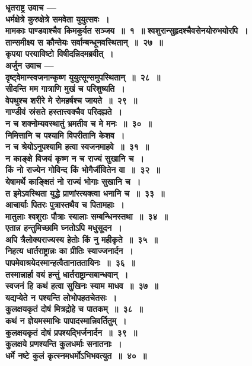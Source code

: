 \begin{center}{\bfseries धृतराष्ट्र उवाच —\\ धर्मक्षेत्रे कुरुक्षेत्रे समवेता युयुत्सवः~।\\मामकाः पाण्डवाश्चैव किमकुर्वत सञ्जय~॥~१~॥}
{\bfseries श्वशुरान्सुहृदश्चैवसेनयोरुभयोरपि~।\\तान्समीक्ष्य स कौन्तेयः सर्वान्बन्धूनवस्थितान्~॥~२७~॥}\\[10pt]
{\bfseries कृपया परयाविष्टो विषीदन्निदमब्रवीत्~।\\अर्जुन उवाच —\\दृष्ट्वेमान्स्वजनान्कृष्ण युयुत्सून्समुपस्थितान्~॥~२८~॥}\\[10pt]
{\bfseries सीदन्ति मम गात्राणि मुखं च परिशुष्यति~।\\वेपथुश्च शरीरे मे रोमहर्षश्च जायते~॥~२९~॥}\\[10pt]
{\bfseries गाण्डीवं स्रंसते हस्तात्त्वक्चैव परिदह्यते~।\\न च शक्नोम्यवस्थातुं भ्रमतीव च मे मनः~॥~३०~॥}\\[10pt]
{\bfseries निमित्तानि च पश्यामि विपरीतानि केशव~।\\न च श्रेयोऽनुपश्यामि हत्वा स्वजनमाहवे~॥~३१~॥}\\[10pt]
{\bfseries न काङ्क्षे विजयं कृष्ण न च राज्यं सुखानि च~।\\किं नो राज्येन गोविन्द किं भोगैर्जीवितेन वा~॥~३२~॥}\\[10pt]
{\bfseries येषामर्थे काङ्क्षितं नो राज्यं भोगाः सुखानि च~।\\त इमेऽवस्थिता युद्धे प्राणांस्त्यक्त्वा धनानि च~॥~३३~॥}\\[10pt]
{\bfseries आचार्याः पितरः पुत्रास्तथैव च पितामहाः~।\\मातुलाः श्वशुराः पौत्राः स्यालाः सम्बन्धिनस्तथा~॥~३४~॥}\\[10pt]
{\bfseries एतान्न हन्तुमिच्छामि घ्नतोऽपि मधुसूदन~।\\अपि त्रैलोक्यराज्यस्य हेतोः किं नु महीकृते~॥~३५~॥}\\[10pt]
{\bfseries निहत्य धार्तराष्ट्रान्नः का प्रीतिः स्याज्जनार्दन~।\\पापमेवाश्रयेदस्मान्हत्वैतानाततायिनः~॥~३६~॥}\\[10pt]
{\bfseries तस्मान्नार्हा वयं हन्तुं धार्तराष्ट्रान्सबान्धवान्~।\\स्वजनं हि कथं हत्वा सुखिनः स्याम माधव~॥~३७~॥}\\[10pt]
{\bfseries यद्यप्येते न पश्यन्ति लोभोपहतचेतसः~।\\कुलक्षयकृतं दोषं मित्रद्रोहे च पातकम्~॥~३८~॥}\\[10pt]
{\bfseries कथं न ज्ञेयमस्माभिः पापादस्मान्निवर्तितुम्~।\\कुलक्षयकृतं दोषं प्रपश्यद्भिर्जनार्दन~॥~३९~॥}\\[10pt]
{\bfseries कुलक्षये प्रणश्यन्ति कुलधर्माः सनातनाः~।\\धर्मे नष्टे कुलं कृत्स्नमधर्मोऽभिभवत्युत~॥~४०~॥}\\[10pt]

\end{center}
